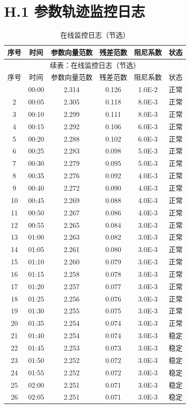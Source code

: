 \section*{H.1 参数轨迹监控日志}
{
\footnotesize
\begin{longtable}{cccccc}
\caption{在线监控日志（节选）}\\
\toprule
序号 & 时间 & 参数向量范数 & 残差范数 & 阻尼系数 & 状态\\
\midrule
\endfirsthead
\multicolumn{6}{c}{续表：在线监控日志（节选）}\\
\toprule
序号 & 时间 & 参数向量范数 & 残差范数 & 阻尼系数 & 状态\\
\midrule
\endhead
\bottomrule
\endfoot
1&00:00&2.314&0.126&1.0E-2&正常\\
2&00:05&2.305&0.118&8.0E-3&正常\\
3&00:10&2.299&0.111&8.0E-3&正常\\
4&00:15&2.292&0.106&6.0E-3&正常\\
5&00:20&2.288&0.102&6.0E-3&正常\\
6&00:25&2.283&0.098&5.0E-3&正常\\
7&00:30&2.279&0.095&5.0E-3&正常\\
8&00:35&2.276&0.092&4.0E-3&正常\\
9&00:40&2.272&0.090&4.0E-3&正常\\
10&00:45&2.269&0.088&4.0E-3&正常\\
11&00:50&2.267&0.086&4.0E-3&正常\\
12&00:55&2.265&0.084&3.0E-3&正常\\
13&01:00&2.263&0.082&3.0E-3&正常\\
14&01:05&2.261&0.080&3.0E-3&正常\\
15&01:10&2.260&0.079&3.0E-3&正常\\
16&01:15&2.258&0.078&3.0E-3&正常\\
17&01:20&2.257&0.077&3.0E-3&正常\\
18&01:25&2.256&0.076&3.0E-3&正常\\
19&01:30&2.255&0.075&3.0E-3&正常\\
20&01:35&2.254&0.074&3.0E-3&正常\\
21&01:40&2.254&0.074&3.0E-3&稳定\\
22&01:45&2.253&0.073&3.0E-3&稳定\\
23&01:50&2.252&0.072&3.0E-3&稳定\\
24&01:55&2.252&0.072&3.0E-3&稳定\\
25&02:00&2.251&0.071&3.0E-3&稳定\\
26&02:05&2.251&0.071&3.0E-3&稳定\\

\end{longtable}}
